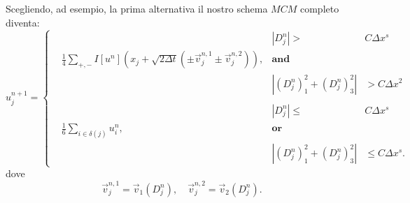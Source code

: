 Scegliendo, ad esempio, la prima alternativa il nostro schema $\mathit{MCM}$ completo diventa:
\begin{equation}
  \label{eq:mcm-schema}
  u_j^{n+1}=
  \left\{
  \begin{aligned}
    &   &\scriptstyle|D_j^n|>&\scriptstyle C\Delta x^s\\ 
    &\frac{1}{4}\sum_{+,-}I[u^n](x_j+\sqrt{2\Delta t}(\pm\vec{v}_{j}^{n,1}\pm\vec{v}_{j}^{n,2})),  &\scriptstyle\mathbf{and} \\
    &  &\scriptstyle|(D_j^n)_1^2+(D_j^n)_3^2|&\scriptstyle >C\Delta x^2 \\
    &  &  \\
    &  &\scriptstyle|D_j^n|\leq&\scriptstyle C\Delta x^s \\
     & \frac{1}{6}\sum_{i\in\delta(j)}u_i^n,   &\scriptstyle\mathbf{or} \\
  &  &\scriptstyle|(D_j^n)_1^2+(D_j^n)_3^2| &\scriptstyle\leq C\Delta x^s.
  \end{aligned}   
  \right.
\end{equation}
dove
\begin{equation} 
  \label{eq:cp3-sc3-1-end}
  \vec{v}_{j}^{n,1}=\vec{v}_1(D_j^n), \quad\vec{v}_j^{n,2}=\vec{v}_2(D_j^n).
\end{equation} 

%
